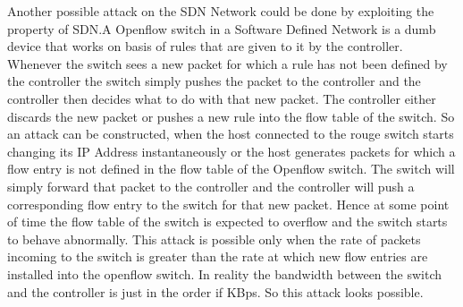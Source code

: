 Another possible attack on the SDN Network could be done by exploiting the property of SDN.A Openflow switch in a Software Defined Network is a dumb device that works on basis of rules that are given to it by the controller. Whenever the switch sees a new packet for which a rule has not been defined by the controller the switch simply pushes the packet to the controller and the controller then decides what to do with that new packet. The controller either discards the new packet or pushes a new rule into the flow table of the switch.  
So an attack can be constructed, when the host connected to the rouge switch starts changing its IP Address instantaneously or the host generates packets for which a flow entry is not defined in the flow table of the Openflow switch. The switch will simply forward that packet to the controller and the controller will push a corresponding flow entry to the switch for that new packet. Hence at some point of time the flow table of the switch is expected to overflow and the switch starts to behave abnormally. This attack is possible only when the rate of packets incoming to the switch is greater than the rate at which new flow entries are installed into the openflow switch. In reality the bandwidth between the switch and the controller is just in the order if KBps. So this attack looks possible.    

